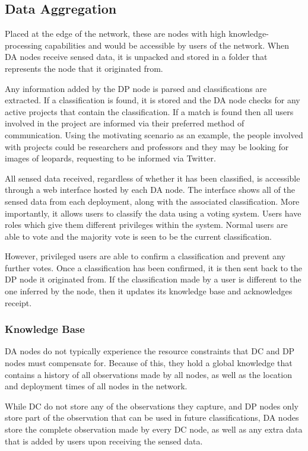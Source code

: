 	\subsection{Data Aggregation}
	Placed at the edge of the network, these are nodes with high knowledge-processing capabilities and would be accessible by users of the network. When DA nodes receive sensed data, it is unpacked and stored in a folder that represents the node that it originated from. 
	
	Any information added by the DP node is parsed and classifications are extracted. If a classification is found, it is stored and the DA node checks for any active projects that contain the classification. If a match is found then all users involved in the project are informed via their preferred method of communication. Using the motivating scenario as an example, the people involved with projects could be researchers and professors and they may be looking for images of leopards, requesting to be informed via Twitter.
	
	All sensed data received, regardless of whether it has been classified, is accessible through a web interface hosted by each DA node. The interface shows all of the sensed data from each deployment, along with the associated classification. More importantly, it allows users to classify the data using a voting system. Users have roles which give them different privileges within the system. Normal users are able to vote and the majority vote is seen to be the current classification.
	
	However, privileged users are able to confirm a classification and prevent any further votes. Once a classification has been confirmed, it is then sent back to the DP node it originated from. If the classification made by a user is different to the one inferred by the node, then it updates its knowledge base and acknowledges receipt.
	
	\subsubsection{Knowledge Base}
	DA nodes do not typically experience the resource constraints that DC and DP nodes must compensate for. Because of this, they hold a global knowledge that contains a history of all observations made by all nodes, as well as the location and deployment times of all nodes in the network.
	
	While DC do not store any of the observations they capture, and DP nodes only store part of the observation that can be used in future classifications, DA nodes store the complete observation made by every DC node, as well as any extra data that is added by users upon receiving the sensed data.
	
